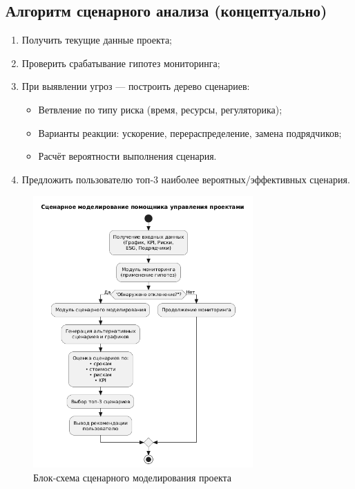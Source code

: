 \documentclass[12pt]{article}
\begin{document}
\subsection{Алгоритм сценарного анализа (концептуально)}
\begin{enumerate}
    \item Получить текущие данные проекта;
    \item Проверить срабатывание гипотез мониторинга;
    \item При выявлении угроз — построить дерево сценариев:
    \begin{itemize}
        \item Ветвление по типу риска (время, ресурсы, регуляторика);
        \item Варианты реакции: ускорение, перераспределение, замена подрядчиков;
        \item Расчёт вероятности выполнения сценария.
    \end{itemize}
    \item Предложить пользователю топ‑3 наиболее вероятных/эффективных сценария.
\end{enumerate}
\begin{figure}[H]
    \centering
    \includegraphics[width=0.75\textwidth]{1.png}
    \caption{Блок-схема сценарного моделирования проекта}
    \label{fig:scenario-model}
\end{figure}
\end{document}
